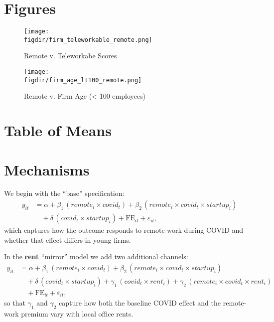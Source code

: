 \documentclass{article}
\newcommand{\cleanedresultsdir}{../results/cleaned}
\newcommand{\figdir}{../results/figures}
\begin{document}
\section{Figures}

\begin{figure}[H]
  \centering
  \texttt{[image: \\figdir/firm\_teleworkable\_remote.png]}
  \caption{Remote v. Teleworkabe Scores}
\end{figure}

\begin{figure}[H]
  \centering
  \texttt{[image: \\figdir/firm\_age\_lt100\_remote.png]}
  \caption{Remote v. Firm Age (\textless{} 100 employees)}
\end{figure}

\clearpage

\section{Table of Means}


\section{Mechanisms}

We begin with the “base” specification:
\[
\begin{aligned}
y_{it} &= \alpha 
  + \beta_1\,(remote_i \times covid_t)
  + \beta_2\,(remote_i \times covid_t \times startup_i) \\
       &\quad
  + \delta\,(covid_t \times startup_i)
  + \mathrm{FE}_{it}
  + \varepsilon_{it},
\end{aligned}
\]
which captures how the outcome responds to remote work during COVID and
whether that effect differs in young firms.

In the \textbf{rent} “mirror” model we add two additional channels:
\[
\begin{aligned}
y_{it} &= \alpha 
  + \beta_1\,(remote_i \times covid_t)
  + \beta_2\,(remote_i \times covid_t \times startup_i) \\
       &\quad
  + \delta\,(covid_t \times startup_i)
  + \gamma_1\,(covid_t \times rent_i)
  + \gamma_2\,(remote_i \times covid_t \times rent_i) \\
       &\quad
  + \mathrm{FE}_{it}
  + \varepsilon_{it},
\end{aligned}
\]
so that \(\gamma_1\) and \(\gamma_2\) capture how both the baseline COVID
effect and the remote‐work premium vary with local office rents.
\end{document}
